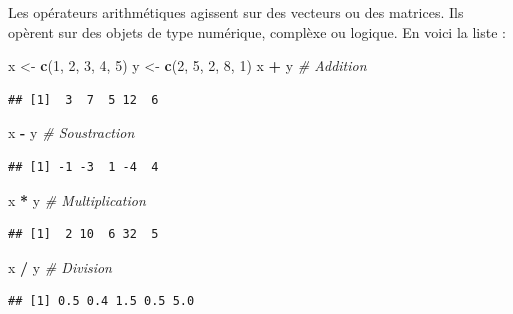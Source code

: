 \documentclass[
  11pt,
]{book}
\newenvironment{Shaded}{\begin{snugshade}}{\end{snugshade}}
\newcommand{\CommentTok}[1]{\textcolor[rgb]{0.56,0.35,0.01}{\textit{#1}}}
\newcommand{\DecValTok}[1]{\textcolor[rgb]{0.00,0.00,0.81}{#1}}
\newcommand{\KeywordTok}[1]{\textcolor[rgb]{0.13,0.29,0.53}{\textbf{#1}}}
\newcommand{\NormalTok}[1]{#1}
\newcommand{\OperatorTok}[1]{\textcolor[rgb]{0.81,0.36,0.00}{\textbf{#1}}}
\newcommand{\StringTok}[1]{\textcolor[rgb]{0.31,0.60,0.02}{#1}}
\numberwithin{equation}{section}
\numberwithin{countremarque}{section}
\begin{document}
Les opérateurs arithmétiques agissent sur des vecteurs ou des matrices. Ils opèrent sur des objets de type numérique, complèxe ou logique. En voici la liste :

\begin{Shaded}
\begin{Highlighting}[]
\NormalTok{x \textless{}{-}}\StringTok{ }\KeywordTok{c}\NormalTok{(}\DecValTok{1}\NormalTok{, }\DecValTok{2}\NormalTok{, }\DecValTok{3}\NormalTok{, }\DecValTok{4}\NormalTok{, }\DecValTok{5}\NormalTok{)}
\NormalTok{y \textless{}{-}}\StringTok{ }\KeywordTok{c}\NormalTok{(}\DecValTok{2}\NormalTok{, }\DecValTok{5}\NormalTok{, }\DecValTok{2}\NormalTok{, }\DecValTok{8}\NormalTok{, }\DecValTok{1}\NormalTok{)}
\NormalTok{x }\OperatorTok{+}\StringTok{ }\NormalTok{y  }\CommentTok{\# Addition}
\end{Highlighting}
\end{Shaded}

\begin{lstlisting}
## [1]  3  7  5 12  6
\end{lstlisting}

\begin{Shaded}
\begin{Highlighting}[]
\NormalTok{x }\OperatorTok{{-}}\StringTok{ }\NormalTok{y  }\CommentTok{\# Soustraction}
\end{Highlighting}
\end{Shaded}

\begin{lstlisting}
## [1] -1 -3  1 -4  4
\end{lstlisting}

\begin{Shaded}
\begin{Highlighting}[]
\NormalTok{x }\OperatorTok{*}\StringTok{ }\NormalTok{y   }\CommentTok{\# Multiplication}
\end{Highlighting}
\end{Shaded}

\begin{lstlisting}
## [1]  2 10  6 32  5
\end{lstlisting}

\begin{Shaded}
\begin{Highlighting}[]
\NormalTok{x }\OperatorTok{/}\StringTok{ }\NormalTok{y   }\CommentTok{\# Division}
\end{Highlighting}
\end{Shaded}

\begin{lstlisting}
## [1] 0.5 0.4 1.5 0.5 5.0
\end{lstlisting}
\end{document}
